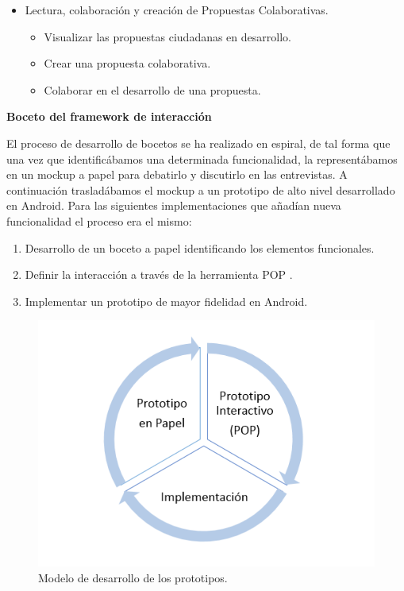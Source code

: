 \begin{itemize}
 \item Lectura, colaboración y creación de Propuestas Colaborativas.
 \begin{itemize}
  \item Visualizar las propuestas ciudadanas en desarrollo.
  \item Crear una propuesta colaborativa.
  \item Colaborar en el desarrollo de una propuesta.
 \end{itemize}
\end{itemize}

\textbf{Boceto del framework de interacción}

El proceso de desarrollo de bocetos se ha realizado en espiral, de tal forma que una vez que identificábamos una determinada funcionalidad, la representábamos en un mockup a papel para debatirlo y discutirlo en las entrevistas. A continuación trasladábamos el mockup a un prototipo de alto nivel desarrollado en Android. Para las siguientes implementaciones que añadían nueva funcionalidad el proceso era el mismo:

\begin{enumerate}
 \item Desarrollo de un boceto a papel identificando los elementos funcionales.
 \item Definir la interacción a través de la herramienta POP \cite{ref:pop}.
 \item Implementar un prototipo de mayor fidelidad en Android. 
\end{enumerate}

  \begin{figure}[h]
   \centering
	\includegraphics[keepaspectratio, scale=1]{Media/Captures/prototypesDiagram.png}
    \caption{Modelo de desarrollo de los prototipos.}
   \label{fig:sequenceDiagram_waveWebSocket}
  \end{figure}
  
